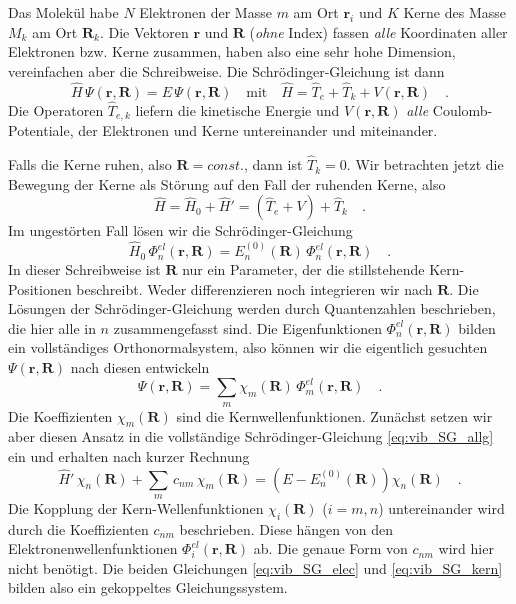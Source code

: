 Das Molekül habe $N$ Elektronen der Masse $m$ am Ort $\mathbf{r}_i$ und $K$ Kerne des Masse $M_k$ am Ort $\mathbf{R}_k$. Die Vektoren $\mathbf{r}$ und $\mathbf{R}$ (\emph{ohne} Index) fassen \emph{alle} Koordinaten aller Elektronen bzw. Kerne zusammen, haben also eine sehr hohe Dimension, vereinfachen aber die Schreibweise. Die Schrödinger-Gleichung ist dann
\begin{equation}
 \hat{H} \, \Psi (\mathbf{r}, \mathbf{R}) = E \, \Psi (\mathbf{r}, \mathbf{R}) \quad \text{mit} \quad
  \hat{H} =  \hat{T}_e + \hat{T}_k + V (\mathbf{r}, \mathbf{R})  \quad .
  \label{eq:vib_SG_allg}
\end{equation}
Die Operatoren $\hat{T}_{e,k}$ liefern die kinetische Energie und  $ V (\mathbf{r}, \mathbf{R}) $ \emph{alle} Coulomb-Potentiale, der Elektronen und Kerne untereinander und miteinander.

Falls die Kerne ruhen, also $\mathbf{R} = const.$, dann ist $\hat{T}_k = 0$. Wir betrachten jetzt die Bewegung der Kerne als Störung auf den Fall der ruhenden Kerne, also
\begin{equation}
 \hat{H} = \hat{H}_0 + \hat{H}' = \left( \hat{T}_e + V \right) +  \hat{T}_k \quad .
\end{equation}
Im ungestörten Fall lösen wir die Schrödinger-Gleichung
\begin{equation}
\hat{H}_0 \, \Phi_n^{el}  (\mathbf{r}, \mathbf{R})  = E_n^{(0)}  (\mathbf{R})  \, \Phi_n^{el}  (\mathbf{r}, \mathbf{R})   \quad .  \label{eq:vib_SG_elec}
\end{equation}
In dieser Schreibweise ist $\mathbf{R}$ nur ein Parameter, der die stillstehende Kern-Positionen beschreibt. Weder differenzieren noch integrieren wir nach  $\mathbf{R}$. Die Lösungen der Schrödinger-Gleichung werden durch Quantenzahlen beschrieben, die hier alle in $n$ zusammengefasst sind. Die Eigenfunktionen $\Phi_n^{el}  (\mathbf{r}, \mathbf{R}) $ bilden ein vollständiges Orthonormalsystem, also können wir die eigentlich gesuchten $\Psi (\mathbf{r}, \mathbf{R})$ nach diesen entwickeln
\begin{equation}
\Psi (\mathbf{r}, \mathbf{R}) = \sum_m \chi_m (\mathbf{R}) \,\Phi_m^{el}  (\mathbf{r}, \mathbf{R})  \quad .
\end{equation}
Die Koeffizienten $\chi_m (\mathbf{R}) $ sind die Kernwellenfunktionen. Zunächst setzen wir aber diesen Ansatz in die vollständige Schrödinger-Gleichung   \ref{eq:vib_SG_allg} ein und erhalten nach kurzer Rechnung
\begin{equation}
\hat{H}' \, \chi_n (\mathbf{R}) + \sum_m \, c_{n m} \, \chi_m (\mathbf{R}) = \left( E - E_n^{(0)}(\mathbf{R})  \right) \chi_n (\mathbf{R})   \quad . \label{eq:vib_SG_kern}
\end{equation}
Die Kopplung der Kern-Wellenfunktionen $\chi_i (\mathbf{R}) $ ($i = m,n$) untereinander wird durch die Koeffizienten $c_{nm}$ beschrieben. Diese hängen von den Elektronenwellenfunktionen $\Phi_i^{el}  (\mathbf{r}, \mathbf{R}) $   ab. Die genaue Form von $c_{nm}$  wird hier nicht benötigt. Die beiden Gleichungen   \ref{eq:vib_SG_elec} und   \ref{eq:vib_SG_kern} bilden also ein gekoppeltes Gleichungssystem.

